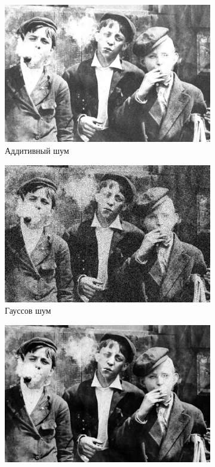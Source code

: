 \begin{figure}[ht!]
\begin{subfigure}[b]{0.5\linewidth}
      \includegraphics[width=0.95\linewidth]{../Wiener_Filter/Wiener_Additive_noise_(k=3).jpg} 
      \caption{Аддитивный шум} 
      \label{weiner_3:c} 
      \vspace{4ex}
    \end{subfigure}%
    \begin{subfigure}[b]{0.5\linewidth}
      \centering
      \includegraphics[width=0.95\linewidth]{../Wiener_Filter/Wiener_Gaussian_noise_(k=3).jpg} 
      \caption{Гауссов шум} 
      \label{weiner_3:d} 
      \vspace{4ex}
    \end{subfigure}
    \begin{subfigure}[b]{0.5\linewidth}
      \centering
      \includegraphics[width=0.95\linewidth]{../Wiener_Filter/Wiener_Poisson_noise_(k=3).jpg} 

\end{subfigure}
\end{figure}
